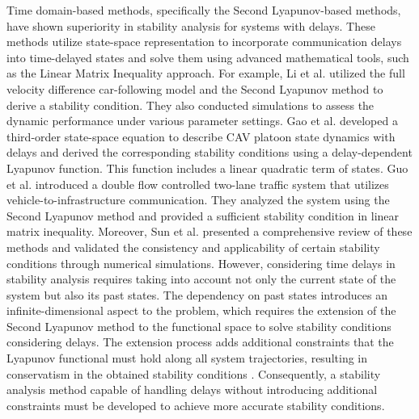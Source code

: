 \documentclass[journal]{IEEEtran}
\begin{document}
Time domain-based methods, specifically the Second Lyapunov-based methods, have shown superiority in stability analysis for systems with delays. These methods utilize state-space representation to incorporate communication delays into time-delayed states and solve them using advanced mathematical tools, such as the Linear Matrix Inequality approach. For example, Li et al. \citep{li2010lyapunov, li2013stability} utilized the full velocity difference car-following model and the Second Lyapunov method to derive a stability condition. They also conducted simulations to assess the dynamic performance under various parameter settings. Gao et al. \citep{gao2016robust} developed a third-order state-space equation to describe CAV platoon state dynamics with delays and derived the corresponding stability conditions using a delay-dependent Lyapunov function. This function includes a linear quadratic term of states. Guo et al. introduced a double flow controlled two-lane traffic system that utilizes vehicle-to-infrastructure communication. They analyzed the system using the Second Lyapunov method and provided a sufficient stability condition in linear matrix inequality\citep{guo2023stability}. Moreover, Sun et al. \citep{sun_stability_2018} presented a comprehensive review of these methods and validated the consistency and applicability of certain stability conditions through numerical simulations. However, considering time delays in stability analysis requires taking into account not only the current state of the system but also its past states. The dependency on past states introduces an infinite-dimensional aspect to the problem, which requires the extension of the Second Lyapunov method to the functional space to solve stability conditions considering delays. The extension process adds additional constraints that the Lyapunov functional must hold along all system trajectories, resulting in conservatism in the obtained stability conditions \citep{fridman2006descriptor, wang2016fuzzy, lian2020dissipativity}. Consequently, a stability analysis method capable of handling delays without introducing additional constraints must be developed to achieve more accurate stability conditions.
\end{document}
